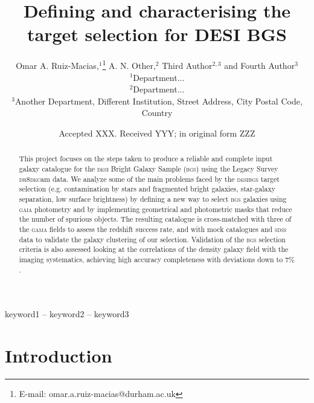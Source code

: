 \documentclass[fleqn,usenatbib]{mnras}
\title[Short title, max. 45 characters]{Defining and characterising the target selection for DESI BGS}
\author[Omar A. Ruiz-Macias et al.]{
Omar A. Ruiz-Macias,$^{1}$\thanks{E-mail: omar.a.ruiz-macias@durham.ac.uk}
A. N. Other,$^{2}$
Third Author$^{2,3}$
and Fourth Author$^{3}$
\\
$^{1}$Department...\\
$^{2}$Department...\\
$^{3}$Another Department, Different Institution, Street Address, City Postal Code, Country
}
\date{Accepted XXX. Received YYY; in original form ZZZ}
\newcommand{\BGS}{\textsc{bgs}\xspace}
\newcommand{\DECam}{\textsc{dec}am\xspace}
\newcommand{\DESI}{\textsc{desi}\xspace}
\newcommand{\DReight}{\textsc{dr8}\xspace}
\newcommand{\GAMA}{\textsc{gama}\xspace}
\newcommand{\GAIA}{\textsc{gaia}\xspace}
\newcommand{\SDSS}{\textsc{sdss}\xspace}
\begin{document}
\label{firstpage}
\pagerange{\pageref{firstpage}--\pageref{lastpage}}
\maketitle

\begin{abstract}
This project focuses on the steps taken to produce a reliable and complete input galaxy catalogue for the \DESI Bright Galaxy Sample (\BGS) using the Legacy Survey \DReight \DECam data. We analyze some of the main problems faced by the \DESI \BGS target selection (e.g. contamination by stars and fragmented bright galaxies, star-galaxy separation, low surface brightness) by defining a new way to select \BGS galaxies using \GAIA photometry and by implementing geometrical and photometric masks that reduce the number of spurious objects. The resulting catalogue is cross-matched with three of the \GAMA fields to assess the redshift success rate, and with mock catalogues and \SDSS data to validate the galaxy clustering of our selection. Validation of the \BGS selection criteria is also assessed looking at the correlations of the density galaxy field with the imaging systematics, achieving high accuracy completeness with deviations down to $7\%$.
\end{abstract}

\begin{keywords}
keyword1 -- keyword2 -- keyword3
\end{keywords}



\section{Introduction}\label{sec:intro} %
\end{document}
